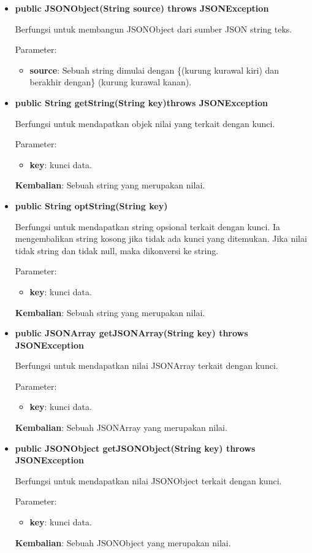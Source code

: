 \begin{itemize}
	
	\item \textbf{public JSONObject(String source) throws JSONException}
	
	Berfungsi untuk membangun JSONObject dari sumber JSON string teks.
	
	Parameter:
	\begin{itemize}
		\item \textbf{source}: Sebuah string dimulai dengan \{(kurung kurawal kiri) dan berakhir dengan\} (kurung kurawal kanan).
	\end{itemize}
	
	\item \textbf{public String getString(String key)throws JSONException}
	
	Berfungsi untuk mendapatkan objek nilai yang terkait dengan kunci.
	
	Parameter:
	\begin{itemize}
		\item \textbf{key}: kunci data.
	\end{itemize}
	\textbf{Kembalian}: Sebuah string yang merupakan nilai.
	
	\item \textbf{public String optString(String key)}
	
	Berfungsi untuk mendapatkan string opsional terkait dengan kunci. Ia mengembalikan string kosong jika tidak ada kunci yang ditemukan. Jika nilai tidak string dan tidak null, maka dikonversi ke string.
	
	Parameter:
	\begin{itemize}
		\item \textbf{key}: kunci data.
	\end{itemize}
	\textbf{Kembalian}: Sebuah string yang merupakan nilai.
	
	\item \textbf{public JSONArray getJSONArray(String key) throws JSONException}
	
	Berfungsi untuk mendapatkan nilai JSONArray terkait dengan kunci.
	
	Parameter:
	\begin{itemize}
		\item \textbf{key}: kunci data.
	\end{itemize}
	\textbf{Kembalian}: Sebuah JSONArray yang merupakan nilai.
	
	\item \textbf{public JSONObject getJSONObject(String key) throws JSONException}
	
	Berfungsi untuk mendapatkan nilai JSONObject terkait dengan kunci.
	
	Parameter:
	\begin{itemize}
		\item \textbf{key}: kunci data.
	\end{itemize}
	\textbf{Kembalian}: Sebuah JSONObject yang merupakan nilai.
\end{itemize}


